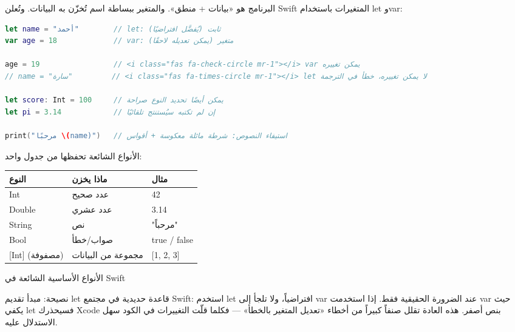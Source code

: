 


البرنامج هو «بيانات + منطق». والمتغير ببساطة اسم تُخزّن به البيانات. وتُعلن Swift المتغيرات باستخدام let وvar:

\begin{lstlisting}[language=Swift]
let name = "أحمد"        // let: ثابت (يُفضَّل افتراضيًا)
var age = 18             // var: متغير (يمكن تعديله لاحقًا)

age = 19                 // <i class="fas fa-check-circle mr-1"></i> var يمكن تغييره
// name = "سارة"         // <i class="fas fa-times-circle mr-1"></i> let لا يمكن تغييره، خطأ في الترجمة

let score: Int = 100     // يمكن أيضًا تحديد النوع صراحة
let pi = 3.14            // إن لم تكتبه سيُستنتج تلقائيًا

print("مرحبًا \(name)")   // استيفاء النصوص: شرطة مائلة معكوسة + أقواس
\end{lstlisting}

الأنواع الشائعة تحفظها من جدول واحد:

\begin{center}
\begin{tabularx}{\linewidth}{|X|X|X|}
\hline
\textbf{النوع} & \textbf{ماذا يخزن} & \textbf{مثال} \tabularnewline
\hline
Int & عدد صحيح & 42 \tabularnewline
Double & عدد عشري & 3.14 \tabularnewline
String & نص & "مرحباً" \tabularnewline
Bool & صواب/خطأ & true / false \tabularnewline
{}[Int] (مصفوفة) & مجموعة من البيانات & {}[1, 2, 3] \tabularnewline
\hline
\end{tabularx}
\end{center}

\begin{center}\small\color{gray}الأنواع الأساسية الشائعة في Swift\end{center}

\begin{tcbinfo}{نصيحة: مبدأ تقديم let}
قاعدة حديدية في مجتمع Swift: استخدم let افتراضياً، ولا تلجأ إلى var عند الضرورة الحقيقية فقط. إذا استخدمت var حيث يكفي let فسيحذرك Xcode بنص أصفر. هذه العادة تقلل صنفاً كبيراً من أخطاء «تعديل المتغير بالخطأ» — فكلما قلّت التغييرات في الكود سهل الاستدلال عليه.

\end{tcbinfo}

